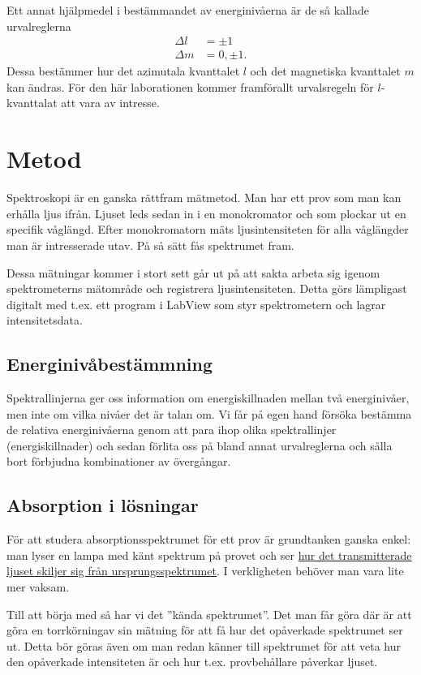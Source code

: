 \documentclass[11pt,a4paper]{article}
\begin{document}
 Ett annat hjälpmedel i bestämmandet av energinivåerna är de så kallade urvalreglerna
 \begin{equation*}
 \begin{aligned}
 \Delta l &= \pm 1\\
 \Delta m &= 0, \pm 1.
 \end{aligned}
 \end{equation*}
 Dessa bestämmer hur det azimutala kvanttalet $l$ och det magnetiska kvanttalet $m$ kan ändras. För den här laborationen kommer framförallt urvalsregeln för $l$-kvanttalat att vara av intresse. 


\section{Metod}
Spektroskopi är en ganska rättfram mätmetod. Man har ett prov som man kan erhålla ljus ifrån. Ljuset leds sedan in i en monokromator och som plockar ut en specifik våglängd. Efter monokromatorn mäts ljusintensiteten för alla våglängder man är intresserade utav. På så sätt fås spektrumet fram.

Dessa mätningar kommer i stort sett går ut på att sakta arbeta sig igenom spektrometerns mätområde och registrera ljusintensiteten. Detta görs lämpligast digitalt med t.ex. ett program i LabView som styr spektrometern och lagrar intensitetsdata. 


\subsection{Energinivåbestämmning}
Spektrallinjerna ger oss information om energiskillnaden mellan två energinivåer, men inte om vilka nivåer det är talan om. Vi får på egen hand försöka bestämma de relativa energinivåerna genom att para ihop olika spektrallinjer (energiskillnader) och sedan förlita oss på bland annat urvalreglerna och sålla bort förbjudna kombinationer av övergångar.

\subsection{Absorption i lösningar}
För att studera absorptionsspektrumet för ett prov är grundtanken ganska enkel: man lyser en lampa med känt spektrum på provet och ser \href{https://xkcd.com/1517/}{hur det transmitterade ljuset skiljer sig från ursprungsspektrumet}. I verkligheten behöver man vara lite mer vaksam. 

Till att börja med så har vi det ''kända spektrumet''. Det man får göra där är att göra en torrkörning\footnotemark av sin mätning för att få hur det opåverkade spektrumet ser ut. Detta bör göras även om man redan känner till spektrumet för att veta hur den opåverkade intensiteten är och hur t.ex. provbehållare påverkar ljuset. 
\end{document}
